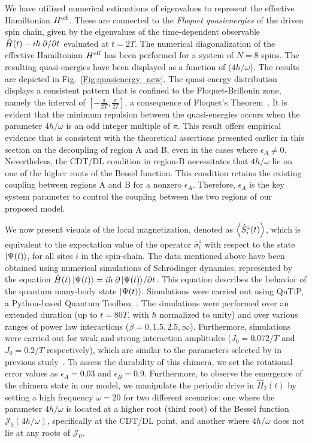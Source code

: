 \documentclass[12pt]{iopart}
\begin{document}
We have utilized numerical estimations of eigenvalues to represent the effective Hamiltonian $H^{\rm eff}$. These are connected to the \textit{ Floquet quasienergies} of the driven spin chain, given by the eigenvalues of the time-dependent observable $\hat{H}(t)-i\hbar\pdv*{}{t}$ evaluated at $t=2T$. The numerical diagonalization of the effective Hamiltonian $H^{\rm eff}$ has been performed for a system of $N=8$ spins. The resulting quasi-energies have been displayed as a function of ($4h/\omega$). The results are depicted in Fig.~\ref{Fig:quasienergy_new}. The quasi-energy distribution displays a consistent pattern that is confined to the Floquet-Brillouin zone, namely the interval of $[-\frac{\pi}{2T}, \frac{\pi}{2T}]$, a consequence of Floquet's Theorem~\cite{dutta2014}. It is evident that the minimum repulsion between the quasi-energies occurs when the parameter $4h/\omega$ is an odd integer multiple of $\pi$. This result offers empirical evidence that is consistent with the theoretical assertions presented earlier in this section on the decoupling of region A and B, even in the cases where $\epsilon_A \neq 0$. Nevertheless, the CDT/DL condition in region-B necessitates that $4h/\omega$ lie on one of the higher roots of the Bessel function. This condition retains the existing coupling between regions A and B for a nonzero $\epsilon_A$. Therefore, $\epsilon_A$ is the key system parameter to control the coupling between the two regions of our proposed model. 	
	
We now present visuals of the local magnetization, denoted as $\expval{\hat{S}^z_i (t)}$, which is equivalent to the expectation value of the operator $\hat{\sigma}^z_i$ with respect to the state $\ket{\Psi(t)}$, for all sites $i$ in the spin-chain. The data mentioned above have been obtained using numerical simulations of Schr\"odinger dynamics, represented by the equation $\hat{H}(t)\ket{\Psi(t)}= i \hbar \pdv*{\ket{\Psi(t)}}{t}$. This equation describes the behavior of the quantum many-body state $\ket{\Psi(t)}$. Simulations were carried out using QuTiP, a Python-based Quantum Toolbox~\cite{Johansson2013}. The simulations were performed over an extended duration (up to $t = 80T$, with $\hbar$ normalized to unity) and over various ranges of power law interactions ($\beta = 0,1.5,2.5,\infty$). Furthermore, simulations were carried out for weak and strong interaction amplitudes ($J_0 = 0.072/T$ and $J_0 = 0.2/T$ respectively), which are similar to the parameters selected by in previous study~\cite{sakurai_phys_nodate,zhang_observation_2017}. To assess the durability of this chimera, we set the rotational error values as $\epsilon_A = 0.03$ and $\epsilon_B = 0.9$. Furthermore, to observe the emergence of the chimera state in our model, we manipulate the periodic drive in $\hat{H}_2(t)$ by setting a high frequency $\omega=20$ for two different scenarios: one where the parameter $4h/\omega$ is located at a higher root (third root) of the Bessel function $\mathcal{J}_0(4h/\omega)$, specifically at the CDT/DL point, and another where $4h/\omega$  does not lie at any roots of $\mathcal{J}_0$.
	
\end{document}
